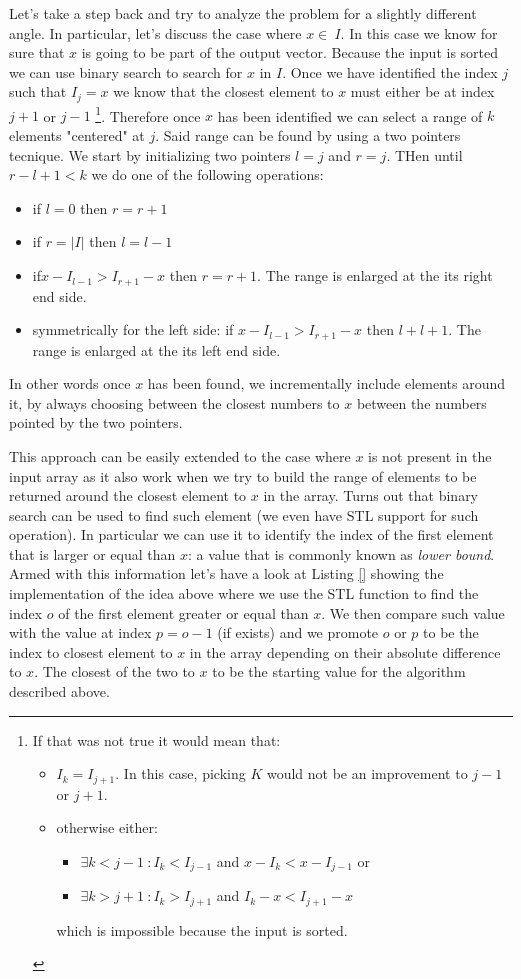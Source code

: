 Let's take a step back and try to analyze the problem for a slightly different angle. In particular, let's discuss the case where $x \in \: I$. In this case we know for sure that $x$ is going to be part of the output vector. 
Because the input is sorted we can use binary search to search for $x$ in $I$. Once we have identified the index $j$ such that $I_j = x$ we know that the closest element to $x$ must either be at index $j+1$ or $j-1$
\footnote{If that was not true it would mean that:
\begin{itemize}
	\item $I_k = I_{j+1}$. In this case, picking $K$  would not be an improvement to $j-1$ or $j+1$.
	\item otherwise either:
	\begin{itemize}
		\item $\exists k < j-1 \: : I_k < I_{j-1}$ and  $x-I_k < x-I_{j-1}$ or
		\item $\exists k > j+1 \: : I_k > I_{j+1}$ and  $I_k-x < I_{j+1}-x$ 
	\end{itemize} which is impossible because the input is sorted.
\end{itemize}}.
Therefore once $x$ has been identified we can select a range of $k$ elements "centered" at $j$.
Said range can be found by using a two pointers tecnique. 
We start by initializing two pointers $l = j$ and $r = j$. THen until $r-l+1 < k$ we do one of the following operations:
\begin{itemize}
	\item if $l = 0$ then $r = r+1$
	\item if $r = |I|$ then $l = l-1$
	\item if$ x-I_{l-1} > I_{r+1}-x$ then $r = r+1$. The range is enlarged at the its right end side.
	\item symmetrically for the left side: if $x-I_{l-1} > I_{r+1}-x$ then $ l + l+1$. The range is enlarged at the its left end side.
\end{itemize}
In other words once $x$ has been found, we incrementally include elements around it, by always choosing between the closest numbers to $x$ between the numbers pointed by the two pointers.

This approach can be easily extended to the case where $x$ is not present in the input array as it also work when we try to 
build the range of elements to be returned around the closest element to $x$ in the array.
Turns out that binary search can be used to find such element (we even have STL support for such operation).
In particular we can use it to identify the index of the first element that is larger or equal than $x$: a value that is commonly known as \textit{lower bound}.
Armed with this information let's have a look at Listing \ref{} showing the implementation of the idea above where we use the STL  function to find the index $o$ of the 
first element greater or equal than $x$. We then compare such value with the value at index $p = o-1$ (if exists) and we promote $o$ or $p$ to be the index to closest element to $x$ in the array depending on their absolute difference to $x$. 
The closest of the two to $x$ to be the starting value for the algorithm described above.



